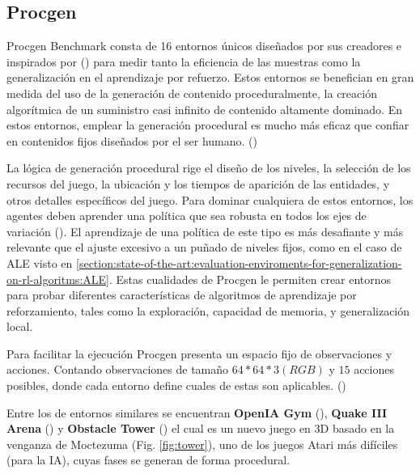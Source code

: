 \subsection{Procgen}

Procgen Benchmark consta de 16 entornos únicos diseñados por sus creadores e inspirados por (\cite{bellemare2013arcade}) para medir tanto la eficiencia de las muestras como la generalización en el aprendizaje por refuerzo. Estos entornos se benefician en gran medida del uso de la generación de contenido proceduralmente, la creación algorítmica de un suministro casi infinito de contenido altamente dominado. En estos entornos, emplear la generación procedural es mucho más eficaz que confiar en contenidos fijos diseñados por el ser humano. (\cite{cobbe2020leveraging})

La lógica de generación procedural rige el diseño de los niveles, la selección de los recursos del juego, la ubicación y los tiempos de aparición de las entidades, y otros detalles específicos del juego. Para dominar cualquiera de estos entornos, los agentes deben aprender una política que sea robusta en todos los ejes de variación (\cite{cobbe2020leveraging}). El aprendizaje de una política de este tipo es más desafiante y más relevante que el ajuste excesivo a un puñado de niveles fijos, como en el caso de ALE visto en \ref{section:state-of-the-art:evaluation-enviroments-for-generalization-on-rl-algoritms:ALE}. Estas cualidades de Procgen le permiten crear entornos para probar diferentes características de algoritmos de aprendizaje por reforzamiento, tales como la exploración, capacidad de memoria, y generalización local.

Para facilitar la ejecución Procgen presenta un espacio fijo de observaciones y acciones. Contando observaciones de tamaño $64*64*3(RGB)$ y $15$ acciones posibles, donde cada entorno define cuales de estas son aplicables. (\cite{cobbe2020leveraging})

Entre los de entornos similares se encuentran \textbf{OpenIA Gym} (\cite{brockman2016openai}), \textbf{Quake III Arena} (\cite{jaderberg2019human}) y \textbf{Obstacle Tower} (\cite{juliani2019obstacle}) el cual es un nuevo juego en 3D basado en la venganza de Moctezuma (Fig. \ref{fig:tower}), uno de los juegos Atari más difíciles (para la IA), cuyas fases se generan de forma procedural.

